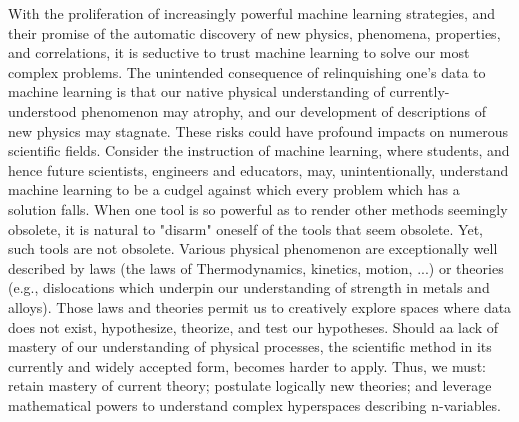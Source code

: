 With the proliferation of increasingly powerful machine learning strategies, and their promise of the automatic discovery of new physics, phenomena, properties, and correlations, it is seductive to trust machine learning to solve our most complex problems. The unintended consequence of relinquishing one's data to machine learning is that our native physical understanding of currently-understood phenomenon may atrophy, and our development of descriptions of new physics may stagnate.  These risks could have profound impacts on numerous scientific fields. Consider the instruction of machine learning, where students, and hence future scientists, engineers and educators, may, unintentionally, understand machine learning to be a cudgel against which every problem which has a solution falls. When one tool is so powerful as to render other methods seemingly obsolete, it is natural to "disarm" oneself of the tools that seem obsolete.  Yet, such tools are not obsolete.  Various physical phenomenon are exceptionally well described by laws (the laws of Thermodynamics, kinetics, motion, ...) or theories (e.g., dislocations which underpin our understanding of strength in metals and alloys).  Those laws and theories permit us to creatively explore spaces where data does not exist, hypothesize, theorize, and test our hypotheses.  Should aa lack of mastery of our understanding of physical processes, the scientific method in its currently and widely accepted form, becomes harder to apply.  Thus, we must: retain mastery of current theory; postulate logically new theories; and leverage mathematical powers to understand complex hyperspaces describing n-variables. \\

